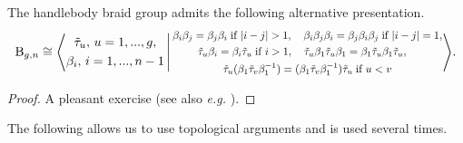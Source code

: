 \documentclass[a4paper,11pt]{amsart}
\newcommand{\eg}{\textsl{e.g.}}
\renewcommand{\dots}{\text{...}}
\newcommand{\setstuff}[1]{\mathrm{#1}}
\numberwithin{equation}{section}
\begin{document}
\begin{proposition}\label{proposition:alternative-presentation}
The handlebody braid group admits the following alternative presentation.
\begin{gather*}
\setstuff{B}_{g,n}\cong
\Bigg\langle
\begin{gathered}
\tilde{\tau}_{u},\,u=1,\dots,g,
\\
\beta_{i},\,i=1,\dots,n-1
\end{gathered}
\,\Bigg\vert\,
\scalebox{0.85}{$
\begin{gathered}
\beta_{i}\beta_{j}=\beta_{j}\beta_{i}\;\text{if }|i-j|>1,\quad
\beta_{i}\beta_{j}\beta_{i}=\beta_{j}\beta_{i}\beta_{j}\;\text{if }|i-j|=1,
\\
\tilde{\tau}_{u}\beta_{i}
=\beta_{i}\tilde{\tau}_{u}\;\text{if }i>1,
\quad
\tilde{\tau}_{u}\beta_{1}\tilde{\tau}_{u}\beta_{1}
=
\beta_{1}\tilde{\tau}_{u}\beta_{1}\tilde{\tau}_{u},
\quad
\\
\tilde{\tau}_{u}(\beta_{1}\tilde{\tau}_{v}\beta_{1}^{-1})
=(\beta_{1}\tilde{\tau}_{v}\beta_{1}^{-1})\tilde{\tau}_{u}
\;\text{if }u<v
\end{gathered}
$}
\Bigg\rangle.
\end{gather*}
\end{proposition}

\begin{proof}
A pleasant exercise (see also {\eg} \cite[Section 5]{HaOlLa-handlebodies}).
\end{proof}

The following allows us to use topological 
arguments and is used several times.
\end{document}
